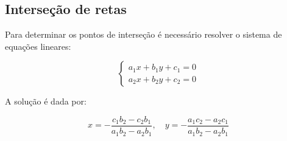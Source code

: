 \subsection{Interseção de retas}

Para determinar os pontos de interseção é necessário resolver o sistema de equações lineares:

\[
\begin{cases}
a_1x + b_1y + c_1 = 0 \\
a_2x + b_2y + c_2 = 0
\end{cases}
\]

A solução é dada por:

\[
x = -\frac{c_1b_2 - c_2b_1}{a_1b_2 - a_2b_1}, \quad y = -\frac{a_1c_2 - a_2c_1}{a_1b_2 - a_2b_1}
\]